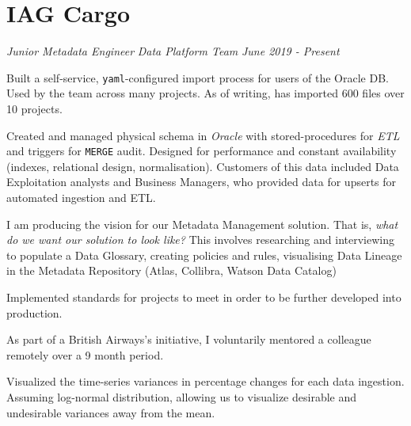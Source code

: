 \documentclass[../cv.tex]{subfiles}
\begin{document}
\section{IAG Cargo}
\textit{Junior Metadata Engineer}
\hfill
\textit{Data Platform Team}
\hfill
\textit{June 2019 - Present}
\begin{description}[style=multiline, leftmargin=3.5cm]
	\item[Self-Service Import Process\\\textnormal{Python, Powershell}]
		Built a self-service, \texttt{yaml}-configured import process for users of the Oracle DB. Used by the team across many projects. As of writing, has imported 600 files over 10 projects. \\
	\item[Sales Schema \textnormal{Oracle}] Created and managed physical schema in \textit{Oracle} with stored-procedures for \textit{ETL} and triggers for \texttt{MERGE} audit. Designed for performance and constant availability (indexes, relational design, normalisation). Customers of this data included Data Exploitation analysts and Business Managers, who provided data for upserts for automated ingestion and ETL.
	\item[Metadata Management] I am producing the vision for our Metadata Management solution. That is, \textit{what do we want our solution to look like?} This involves researching and interviewing to populate a Data Glossary, creating policies and rules, visualising  Data Lineage in the Metadata Repository (Atlas, Collibra, Watson Data Catalog)
	\item[Data Standards] Implemented standards for projects to meet in order to be further developed into production. 
	\item[Mentoring \textnormal{moving-ahead.org}] As part of a British Airways's initiative, I voluntarily mentored a colleague remotely over a 9 month period.
	\item[Vizualizations\\\textnormal{Tableau}] Visualized the time-series variances in percentage changes for each data ingestion. Assuming log-normal distribution, allowing us to visualize desirable and undesirable variances away from the mean.\\\
\end{description}
\end{document}
